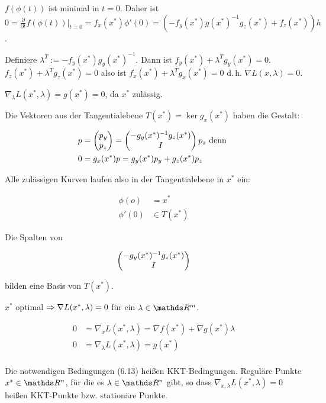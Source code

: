 $f(\phi(t))$ ist minimal in $t=0$. Daher ist $0 = \frac{\partial}{\partial t} f(\phi(t))|_{t=0} = f_x(x^*) \phi'(0) = (-f_y(x^*) g(x^*)^{-1} g_z(x^*) + f_z(x^*))h$.

Definiere $\lambda^T := -f_y(x^*)g_y(x^*)^{-1}$. Dann ist $f_y(x^*) + \lambda^T g_y(x^*) = 0$. $f_z(x^*) + \lambda^T g_z(x^*) = 0$ also ist $f_x(x^*) + \lambda^T g_x(x^*) = 0$ d.\,h. $\nabla L(x,\lambda)=0$.

$\nabla_\lambda L(x^*,\lambda) = g(x^*) = 0$, da $x^*$ zulässig.


Die Vektoren aus der Tangentialebene $T(x^*) = \ker g_x(x^*)$ haben die Gestalt:

\begin{align*}
p &= \begin{pmatrix} p_y \\ p_z \end{pmatrix} = \begin{pmatrix} -g_y(x^*)^{-1} g_z(x^*) \\ I \end{pmatrix} p_z \text{ denn } \\
0 &= g_x(x^*)p = g_y(x^*)p_y + g_z(x^*) p_z \\
\end{align*}

Alle zulässigen Kurven laufen also in der Tangentialebene in $x^*$ ein:

\begin{align*}
\phi(o) &= x^* \\
\phi'(0) &\in T(x^*)
\end{align*}

Die Spalten von

\[ \begin{pmatrix} -g_y(x^*)^{-1} g_z(x^*) \\ I \end{pmatrix} \]

bilden eine Basis von $T(x^*)$.


$x^*$ optimal $\Rightarrow \nabla L(x^*,\lambda) = 0$ für ein $\lambda \in \R^m$.

\begin{align*}
0 &= \nabla_x L(x^*,\lambda) = \nabla f(x^*) + \nabla g(x^*) \lambda \\
0 &= \nabla_\lambda L(x^*, \lambda) = g(x^*) \\
\end{align*}


Die notwendigen Bedingungen (6.13) heißen KKT-Bedingungen. Reguläre Punkte $x^* \in \R^n$, für die es $\lambda \in \R^n$ gibt, so dass $\nabla_{x,\lambda} L(x^*, \lambda) = 0$ heißen KKT-Punkte bzw. stationäre Punkte.

